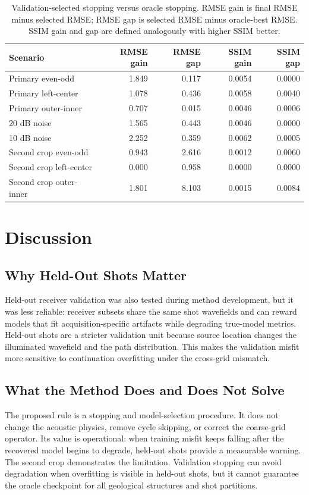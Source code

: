 \documentclass[10pt,twocolumn]{article}
\begin{document}
\begin{table}[t]
\centering
\caption{Validation-selected stopping versus oracle stopping. RMSE gain is
final RMSE minus selected RMSE; RMSE gap is selected RMSE minus oracle-best
RMSE. SSIM gain and gap are defined analogously with higher SSIM better.}
\label{tab:oracle}
\begin{tabular}{lrrrr}
\toprule
Scenario & RMSE gain & RMSE gap & SSIM gain & SSIM gap \\
\midrule
Primary even-odd & 1.849 & 0.117 & 0.0054 & 0.0000 \\
Primary left-center & 1.078 & 0.436 & 0.0058 & 0.0040 \\
Primary outer-inner & 0.707 & 0.015 & 0.0046 & 0.0006 \\
20 dB noise & 1.565 & 0.443 & 0.0046 & 0.0000 \\
10 dB noise & 2.252 & 0.359 & 0.0062 & 0.0005 \\
Second crop even-odd & 0.943 & 2.616 & 0.0012 & 0.0060 \\
Second crop left-center & 0.000 & 0.958 & 0.0000 & 0.0000 \\
Second crop outer-inner & 1.801 & 8.103 & 0.0015 & 0.0084 \\
\bottomrule
\end{tabular}
\end{table}

\section{Discussion}
\subsection{Why Held-Out Shots Matter}
Held-out receiver validation was also tested during method development,
but it was less reliable: receiver subsets share the same shot wavefields
and can reward models that fit acquisition-specific artifacts while
degrading true-model metrics. Held-out shots are a stricter validation
unit because source location changes the illuminated wavefield and the
path distribution. This makes the validation misfit more sensitive to
continuation overfitting under the cross-grid mismatch.

\subsection{What the Method Does and Does Not Solve}
The proposed rule is a stopping and model-selection procedure. It does
not change the acoustic physics, remove cycle skipping, or correct the
coarse-grid operator. Its value is operational: when training misfit keeps
falling after the recovered model begins to degrade, held-out shots
provide a measurable warning. The second crop demonstrates the limitation.
Validation stopping can avoid degradation when overfitting is visible in
held-out shots, but it cannot guarantee the oracle checkpoint for all
geological structures and shot partitions.
\end{document}
